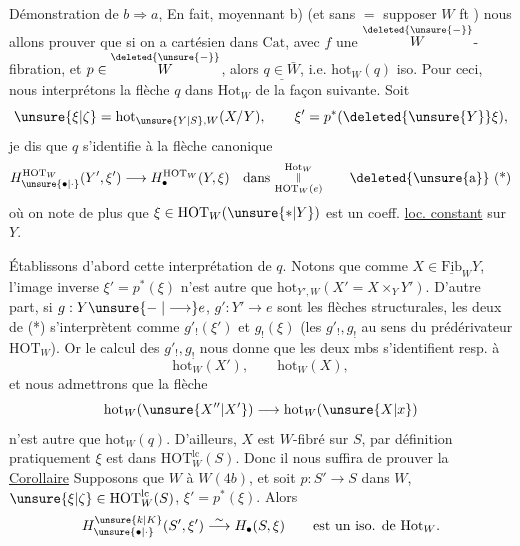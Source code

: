 Démonstration de $b\Longrightarrow a$,    En fait, moyennant b) (et sans $=$ supposer $W$ ft ) nous allons prouver que si on a
cartésien dans $\mathrm{Cat}$, avec
$f$ une $\overset{\deleted{\unsure{-}}}{W}$-fibration, et $p\in\overset{\deleted{\unsure{-}}}{W}$, alors $\underline{q\in\bar W}$, i.e. $\mathrm{hot}_W(q)$ iso. Pour ceci, nous interprétons la flèche $q$ dans $\mathrm{Hot}_W$  de la façon suivante.
Soit
\[
\unsure{\xi|\zeta}=\mathrm{hot}_{\unsure{Y|S},W}(X/Y),\qquad \xi'=p^*(\deleted{\unsure{Y}}\xi),
\]
je dis que $q$ s'identifie à la flèche canonique
\[
H_{\unsure{\bullet|\cdot}}^{\mathrm{HOT}_W}(Y',\xi')\longrightarrow H_{\bullet}^{\mathrm{HOT}_W}(Y,\xi)\quad\text{dans }\substack{\mathrm{Hot}_W\\ \Vert\\ \mathrm{HOT}_W(e)}\tag*{\deleted{\unsure{a}} (*)}
\]
où on note de plus que $\xi\in\mathrm{HOT}_W(\unsure{*|Y})$ est un coeff. \uline{loc. constant} sur $Y$.

Établissons d'abord cette interprétation de $q$. Notons que comme $X\in\underline{\mathrm{Fib}}_W Y$, l'image inverse $\xi'=p^*(\xi)$ n'est autre que $\mathrm{hot}_{Y',W}(X'=X\times_Y Y')$.
D'autre part, si  $g:Y\unsure{\relbar|\longrightarrow}e$, $g':Y'\longrightarrow e$ sont les flèches structurales, les deux  de (*) s'interprètent  comme $g'_!(\xi')$ et $g_!(\xi)$  (les $g'_!,g_!$ au sens du prédérivateur $\mathrm{HOT}_W$).
Or le calcul des $g'_!,g_!$ nous donne que les deux mbs s'identifient resp. à
\[
\mathrm{hot}_W(X'),\qquad\mathrm{hot}_W(X),
\]
et nous admettrons que la flèche 
\[
\mathrm{hot}_W(\unsure{X''|X'})\longrightarrow\mathrm{hot}_W(\unsure{X|x})
\]
n'est autre que $\mathrm{hot}_W(q)$. D'ailleurs,   $X$ est $W$-fibré sur $S$, par définition pratiquement $\xi$ est dans $\mathrm{HOT}_W^{\mathrm{lc}}(S)$. Donc il nous suffira de prouver la
\uline{Corollaire} Supposons que $W$  à $W(4b)$, et soit $p:S'\longrightarrow S$ dans $W$, $\unsure{\xi|\zeta}\in\mathrm{HOT}_W^{\mathrm{lc}}(S)$, $\xi'=p^*(\xi)$. Alors
\[
H_{\unsure{\bullet|\cdot}}^{\unsure{k|K}}(S',\xi')\overset{\sim}{\longrightarrow}H_{\bullet}(S,\xi)\qquad\text{est un iso. de }\mathrm{Hot}_W.
\]

